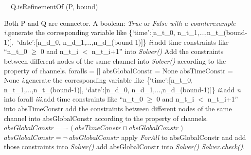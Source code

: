 \documentclass[3p,times]{elsarticle}
\begin{document}
\begin{algorithm}[t]
    \caption{\ \ Q.isRefinementOf (P, bound)}
    \begin{algorithmic}[1]
        \REQUIRE Both P and Q are connector.
        \ENSURE A boolean: \emph{True} or \emph{False with a counterexample}
					\STATE \emph{\large i.}generate the corresponding variable like 					
						\newline  \{`time':[n\_t\_0, n\_t\_1,...,n\_t\_(bound-1)],\  `date':[n\_d\_0, n\_d\_1,...,n\_d\_(bound-1)]\}
						\newline
						\newline \emph{\large ii.}add time constraints like ``n\_t\_0 $\geq$ 0  and  n\_t\_i $<$ n\_t\_i+1'' into \emph{Solver()}
				\ENDIF
			\ENDFOR
		\STATE Add the constraints between different nodes of the same channel into \emph{Solver()} according to the property of channels.
        \ENDFOR
        \newline
        \STATE foralls = []      %
        \STATE absGlobalConstr = None %
        \STATE absTimeConstr = None %
					\STATE \emph{\large i.}generate the corresponding variable like 					
						\newline \{`time':[n\_t\_0, n\_t\_1,...,n\_t\_(bound-1)], `date':[n\_d\_0, n\_d\_1,...,n\_d\_(bound-1)]\}
						\newline
						\newline \emph{\large ii.}add \emph{n} into forall
						\newline
						\newline \emph{\large iii.}add time constraints like ``n\_t\_0 $\geq$ 0  and  n\_t\_i $<$ n\_t\_i+1'' into absTimeConstr
				\ENDIF
			\STATE add the constraints between different nodes of the same channel into absGlobalConstr according to the property of channels.
			\ENDFOR
		\ENDFOR
		\newline
		\STATE $absGlobalConstr = \neg \ (absTimeConstr \cap absGlobalConstr)  $
	\ELSE
		\STATE $absGlobalConstr = \neg \ absGlobalConstr$
	\ENDIF
		\STATE apply \emph{ForAll} to absGlobalConstr
			 and add those constraints into \emph{Solver()}
    \ELSE
    	\STATE add absGlobalConstr into \emph{Solver()}
	\ENDIF	
    \STATE \emph{Solver.check()}.
    \end{algorithmic}
\end{algorithm}
\end{document}
